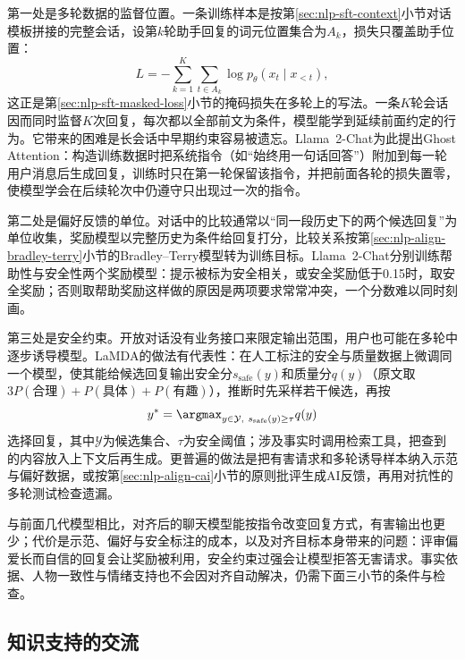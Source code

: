 第一处是多轮数据的监督位置。一条训练样本是按第\ref{sec:nlp-sft-context}小节对话模板拼接的完整会话，设第$k$轮助手回复的词元位置集合为$A_k$，损失只覆盖助手位置：
\begin{equation}
 L=-\sum_{k=1}^{K}\sum_{t\in A_k}\log p_{\theta}(x_t\mid x_{<t}),
 \label{eq:nlp-dialogue-multiturn-sft}
\end{equation}
这正是第\ref{sec:nlp-sft-masked-loss}小节的掩码损失在多轮上的写法。一条$K$轮会话因而同时监督$K$次回复，每次都以全部前文为条件，模型能学到延续前面约定的行为。它带来的困难是长会话中早期约束容易被遗忘。Llama~2-Chat为此提出Ghost Attention：构造训练数据时把系统指令（如“始终用一句话回答”）附加到每一轮用户消息后生成回复，训练时只在第一轮保留该指令，并把前面各轮的损失置零，使模型学会在后续轮次中仍遵守只出现过一次的指令。

第二处是偏好反馈的单位。对话中的比较通常以“同一段历史下的两个候选回复”为单位收集，奖励模型以完整历史为条件给回复打分，比较关系按第\ref{sec:nlp-align-bradley-terry}小节的Bradley--Terry模型转为训练目标。Llama~2-Chat分别训练帮助性与安全性两个奖励模型：提示被标为安全相关，或安全奖励低于0.15时，取安全奖励；否则取帮助奖励这样做的原因是两项要求常常冲突，一个分数难以同时刻画。

第三处是安全约束。开放对话没有业务接口来限定输出范围，用户也可能在多轮中逐步诱导模型。LaMDA的做法有代表性：在人工标注的安全与质量数据上微调同一个模型，使其能给候选回复输出安全分$s_{\mathrm{safe}}(y)$和质量分$q(y)$（原文取$3P(\text{合理})+P(\text{具体})+P(\text{有趣})$），推断时先采样若干候选，再按
\begin{equation}
 y^{*}=\argmax_{y\in\mathcal{Y},\ s_{\mathrm{safe}}(y)\ge\tau}q(y)
 \label{eq:nlp-dialogue-safety-filter}
\end{equation}
选择回复，其中$\mathcal{Y}$为候选集合、$\tau$为安全阈值；涉及事实时调用检索工具，把查到的内容放入上下文后再生成。更普遍的做法是把有害请求和多轮诱导样本纳入示范与偏好数据，或按第\ref{sec:nlp-align-cai}小节的原则批评生成AI反馈，再用对抗性的多轮测试检查遗漏。

与前面几代模型相比，对齐后的聊天模型能按指令改变回复方式，有害输出也更少；代价是示范、偏好与安全标注的成本，以及对齐目标本身带来的问题：评审偏爱长而自信的回复会让奖励被利用，安全约束过强会让模型拒答无害请求。事实依据、人物一致性与情绪支持也不会因对齐自动解决，仍需下面三小节的条件与检查。

\subsection{知识支持的交流}
\label{sec:nlp-dialogue-knowledge}

